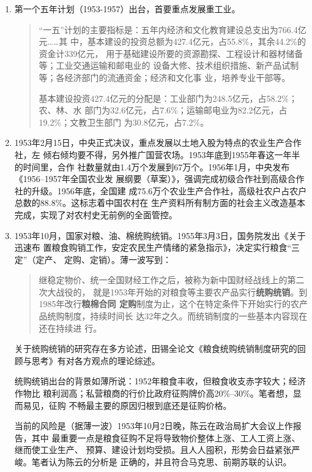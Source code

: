 \begin{enumerate}
\item 第一个五年计划（1953-1957）出台，首要重点发展重工业。
  \begin{quotation}
    “一五”计划的主要指标是：五年内经济和文化教育建设总支出为766.4亿元……其
    中，基本建设的投资总额为427.4亿元，占55.8\%，其余44.2\%的资金计339亿元，
    用于基础建设所要的资源勘探、工程设计和器材储备等；工业交通运输和邮电业的
    设备大修、技术组织措施、新产品试制等；各经济部门的流通资金；经济和文化事
    业，培养专业干部等。

    基本建设投资427.4亿元的分配是：工业部门为248.5亿元，占58.2\%；农、林、水
    部门为32.6亿元，占7.6\%；运输邮电业为82.2亿元，占19.2\%；文教卫生部门
    为30.8亿元，占7.2\%。
  \end{quotation}

\item 1953年2月15日，中央正式决议，重点发展以土地入股为特点的农业生产合作社，左
  倾右倾均要不得，另外推广国营农场。1953年底到1955年春这一年半的时间里，合作
  社数量就由1.4万个发展到67万个。1956年1月，中央发布《1956--1957年全国农业发
  展纲要（草案）》，强调完成初级合作社到高级合作社的升级。1956年底，全国建
  成75.6万个农业生产合作社，高级社农户占农户总数的88.8\%。这标志着中国农村在
  生产资料所有制方面的社会主义改造基本完成，实现了对农村史无前例的全面管控。

\item 1953年10月，国家对粮、油、棉统购统销。1955年3月3日，国务院发出《关于迅速布
  置粮食购销工作，安定农民生产情绪的紧急指示》，决定实行粮食“三定”（定产、
  定购、定销）。薄一波写到：
  \begin{quotation}
    继稳定物价、统一全国财经工作之后，被称为新中国财经战线上的第二次大战役的，
    就是1953年开始的对粮食等主要农产品实行\textbf{统购统销}。到1985年改行\textbf{粮棉合同
      定购}制度为止，这个在特定条件下开始实行的农产品统购制度，持续时间长
    达32年之久。而统销制度的一些基本内容现在还在持续进
    行。\cite[255]{boyibo}
  \end{quotation}

  关于统购统销的研究存在多方论述，田锡全论文《粮食统购统销制度研究的回
  顾与思考》有对各方观点的理论综述。

  统购统销出台的背景如薄所说：1952年粮食丰收，但粮食收支赤字较大；经济作物比
  粮利润高；私营粮商的行价比政府征购牌价高20\%--30\%。笔者想，显而易见，征购
  不畅最主要的原因归根到底还是征购价格。

  当前的风险是（据薄一波）1953年10月2日晚，陈云在政治局扩大会议上作报告，其中
  最重要一点是粮食征购不足将导致物价整体上涨、工人工资上涨、继而使工业生产、
  预算、建设计划均受损。且人人囤积，形势会日益紧张严峻。笔者认为陈云的分析是
  正确的，并且符合马克思、前期苏联的认识。


\end{enumerate}
